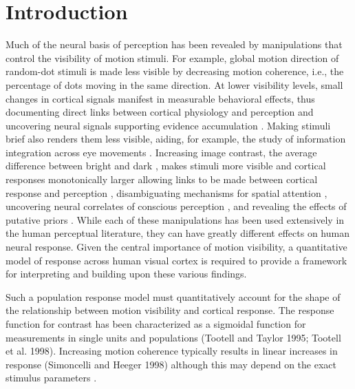 \documentclass{report}
\begin{document}
\section{Introduction}
Much of the neural basis of perception has been revealed by manipulations that control the visibility of motion stimuli. For example, global motion direction of random-dot stimuli is made less visible by decreasing motion coherence, i.e., the percentage of dots moving in the same direction. At lower visibility levels, small changes in cortical signals manifest in measurable behavioral effects, thus documenting direct links between cortical physiology and perception \citep{Britten1992-xy,Newsome1989-fr} and uncovering neural signals supporting evidence accumulation \citep{Huk2005-xg,Katz2016-xc,Roitman2002-mw,Shadlen1996-pr,Shadlen2001-uu}. Making stimuli brief also renders them less visible, aiding, for example, the study of information integration across eye movements \citep{Melcher2003-vw}. Increasing image contrast, the average difference between bright and dark \citep{Bex2002-it}, makes stimuli more visible and cortical responses monotonically larger allowing links to be made between cortical response and perception \citep{Boynton1999-jd,Ress2000-pa,Ress2003-lt}, disambiguating mechanisms for spatial attention \citep{Carrasco2000-es,Hara2014-tm,Hara2014-mv,Pestilli2011-gi}, uncovering neural correlates of conscious perception \citep{Lumer1998-qs,Wunderlich2005-ff}, and revealing the effects of putative priors \citep{Stocker2006-rk,Vintch2014-zu}. While each of these manipulations has been used extensively in the human perceptual literature, they can have greatly different effects on human neural response. Given the central importance of motion visibility, a quantitative model of response across human visual cortex is required to provide a framework for interpreting and building upon these various findings.

Such a population response model must quantitatively account for the shape of the relationship between motion visibility and cortical response. The response function for contrast has been characterized as a sigmoidal function for measurements in single units \citep{Albrecht1982-rq,Sclar1990-lk} and populations \citep{Avidan2002-jg,Boynton1996-ff,Boynton1999-jd,Gardner2005-pg,Logothetis2001-kk,Olman2004-dd} (Tootell and Taylor 1995; Tootell et al. 1998). Increasing motion coherence typically results in linear increases in response \citep{Aspell2005-tc,Britten1993-oh,Handel2007-xk,Rees2000-ul} (Simoncelli and Heeger 1998) although this may depend on the exact stimulus parameters \citep{Ajina2015-xm}.
\end{document}
